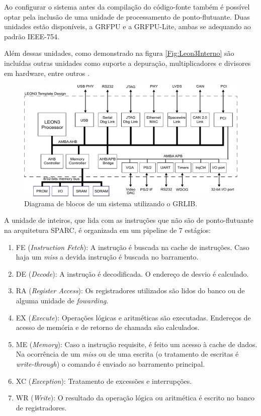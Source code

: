 Ao configurar o sistema antes da compilação do código-fonte também é possível optar pela inclusão de uma unidade de processamento de ponto-flutuante. Duas unidades estão disponíveis, a GRFPU e a GRFPU-Lite, ambas se adequando ao padrão IEEE-754.

Além dessas unidades, como demonstrado na figura \ref{Fig:Leon3Interno} são incluídas outras unidades como suporte a depuração, multiplicadores e divisores em hardware, entre outros \cite{grlibmanual}.


\begin{figure}
	\label{Fig:Leon3Externo}
	\caption[Diagrama de blocos de um sistema utilizando o GRLIB]{
		Diagrama de blocos de um sistema utilizando o GRLIB.}
	\begin{center}
		\includegraphics[width=\linewidth]{fig/leon3externo.pdf}
	\end{center}
\end{figure}

A unidade de inteiros, que lida com as instruções que não são de ponto-flutuante na arquitetura SPARC, é organizada em um pipeline de 7 estágios:

\begin{enumerate}
	\item FE (\textit{Instruction Fetch}): A instrução é buscada na cache de instruções. Caso haja um \textit{miss} a devida instrução é buscada no barramento.
	\item DE (\textit{Decode}): A instrução é decodificada. O endereço de desvio é calculado.
	\item RA (\textit{Register Access}): Os registradores utilizados são lidos do banco ou de alguma unidade de \textit{fowarding}.
	\item EX (\textit{Execute}): Operações lógicas e aritméticas são executadas. Endereços de acesso de memória e de retorno de chamada são calculados.
	\item ME (\textit{Memory}): Caso a instrução requisite, é feito um acesso à cache de dados. Na ocorrência de um \textit{miss} ou de uma escrita (o tratamento de escritas é \textit{write-through}) o comando é enviado ao barramento principal.
	\item XC (\textit{Exception}): Tratamento de excessões e interrupções.
	\item WR (\textit{Write}): O resultado da operação lógica ou aritmética é escrito no banco de registradores.
\end{enumerate}


